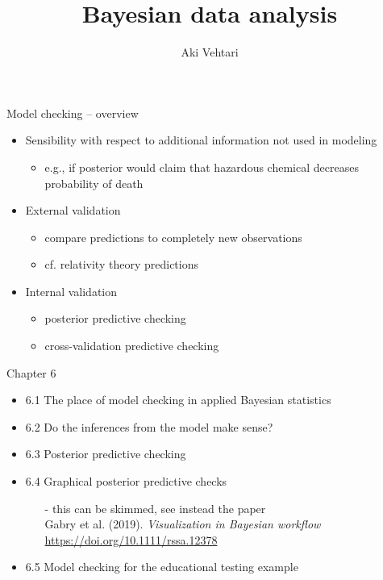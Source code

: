 \documentclass[t]{beamer}
\title[]{Bayesian data analysis}
\subtitle{}
\author{Aki Vehtari}
\institute[Aalto]{}
\begin{document}
 \begin{frame}{Model checking -- overview}

  \begin{itemize}
  \item<+-> Sensibility with respect to additional information not used in modeling
    \begin{itemize}
    \item e.g., if posterior would claim that hazardous chemical
      decreases probability of death
    \end{itemize}
  \item<+-> External validation
    \begin{itemize}
    \item compare predictions to completely new observations
    \item cf. relativity theory predictions
    \end{itemize}
  \item<+-> Internal validation
    \begin{itemize}
    \item posterior predictive checking
    \item cross-validation predictive checking
    \end{itemize}
  \end{itemize}

\end{frame}

\begin{frame}{Chapter 6}

  \begin{itemize}
  \item 6.1 The place of model checking in applied Bayesian statistics
  \item 6.2 Do the inferences from the model make sense?
  \item 6.3 Posterior predictive checking
  \item {\color{gray} 6.4 Graphical posterior predictive checks}    
    \begin{itemize}
    \item[-] this can be skimmed, see instead the paper\\ Gabry et al. (2019). \textit{Visualization in Bayesian workflow} \url{https://doi.org/10.1111/rssa.12378}
  \end{itemize}
\item 6.5 Model checking for the educational testing example
  \end{itemize}
  
\end{frame}
\end{document}
